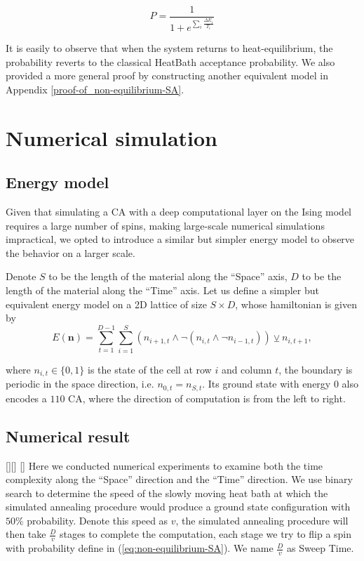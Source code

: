 \documentclass[twocolumn,superscriptaddress,english,showpacs,longbibliography]{revtex4-2}
\newcommand{\jinguo}[1]{[{\color{blue}{JGL: #1}}]}
\newcommand{\ym}[1]{[{\color{red}{YM: #1}}]}
\newcommand{\vn}{{\mathbf{n}}}
\begin{document}
\begin{equation}
    \label{eq:non-equilibrium-SA}
P = \frac{1}{1 + e^{\sum_i \frac{\Delta E_i}{T_i}}}
\end{equation}

It is easily to observe that when the system returns to
heat-equilibrium, the probability reverts to the classical HeatBath
acceptance probability. We also provided a more general proof by constructing another equivalent model in Appendix \ref{proof-of_non-equilibrium-SA}.


\section{Numerical simulation}\label{sec:numerical-result}

\subsection{Energy model}\label{a-2d-surface-programmable-material}

Given that simulating a CA with a deep computational layer on the Ising model requires a large number of spins, making large-scale numerical simulations impractical, we opted to introduce a similar but simpler energy model to observe the behavior on a larger scale.

Denote $S$ to be the length of the material along the ``Space'' axis, $D$
to be the length of the material along the ``Time'' axis. 
Let us define a simpler but equivalent energy model on a 2D lattice of size $S \times D$, whose hamiltonian
is given by
\begin{equation}\label{eq:toy-hamiltonian}
E(\vn) = \sum_{t=1}^{D-1}\sum_{i=1}^{S} (n_{i+1, t} \land \neg(n_{i, t} \land \neg n_{i-1, t})) \veebar n_{i,t+1},
\end{equation}

where $n_{i, t} \in \{0, 1\}$ is the state of the cell at row $i$ and column $t$, the boundary is periodic in the space direction, i.e. $n_{0, t} = n_{S, t}$.
Its ground state with energy $0$ also encodes a $110$ CA, where the direction of computation is from the left to right.
\subsection{Numerical result}

\jinguo{show a comparison from right to left}\jinguo{I have already used D as the dimension}
\ym{Great, i will do this}
Here we conducted numerical experiments to examine both the time complexity along the ``Space'' direction and the ``Time'' direction.
We use binary search to determine the speed of the slowly moving heat bath at which
the simulated annealing procedure would produce 
a ground state configuration with $50\%$ probability. Denote this speed 
as $v$, the simulated annealing procedure will then take $\frac{D}{v}$
stages to complete the computation, each stage we try to flip a spin with 
probability define in (\ref{eq:non-equilibrium-SA}). We name $\frac{D}{v}$ 
as Sweep Time.
\end{document}
